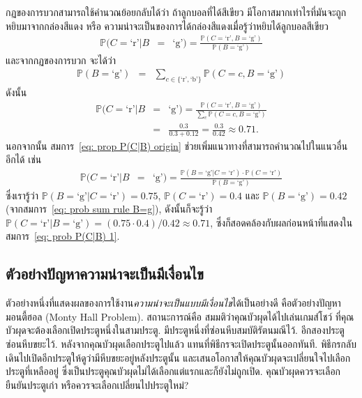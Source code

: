 กฏของการบวกสามารถใช้คำนวณย้อยกลับได้ว่า ถ้าลูกบอลที่ได้สีเขียว มีโอกาสมากเท่าไรที่มันจะถูกหยิบมาจากกล่องสีแดง
หรือ ความน่าจะเป็นของการได้กล่องสีแดงเมื่อรู้ว่าหยิบได้ลูกบอลสีเขียว
\begin{eqnarray}
\mathbb{P}(C = \mbox{`r'}|B &=& \mbox{`g'}) = \frac{\mathbb{P}(C = \mbox{`r'},B = \mbox{`g'})}{\mathbb{P}(B = \mbox{`g'})}
\label{eq: prop P(C|B) origin} 
\end{eqnarray}
และจากกฏของการบวก จะได้ว่า
\begin{eqnarray}
\mathbb{P}(B = \mbox{`g'}) &=&
  \sum_{c \in \{\mbox{`r'}, \mbox{`b'}\} } \mathbb{P}(C=c,B = \mbox{`g'})
\nonumber 
\end{eqnarray}
ดังนั้น
\begin{eqnarray}
\mathbb{P}(C = \mbox{`r'}|B &=& \mbox{`g'}) = \frac{\mathbb{P}(C = \mbox{`r'},B = \mbox{`g'})}{\sum_c \mathbb{P}(C=c,B = \mbox{`g'})}
\label{eq: prob P(C|B) 1} \\
&=& \frac{0.3}{0.3 + 0.12} = \frac{0.3}{0.42} \approx 0.71
\nonumber .
\end{eqnarray}
นอกจากนั้น 
สมการ~\ref{eq: prop P(C|B) origin} ช่วยเพิ่มแนวทางที่สามารถคำนวณไปในแนวอื่นอีกได้ เช่น
\begin{eqnarray}
\mathbb{P}(C = \mbox{`r'}|B &=& \mbox{`g'}) = \frac{\mathbb{P}(B = \mbox{`g'}|C = \mbox{`r'}) \cdot \mathbb{P}(C = \mbox{`r'})}{\mathbb{P}(B = \mbox{`g'})}
\label{eq: prop P(C|B) 2} 
\end{eqnarray}
ซึ่งเรารู้ว่า $\mathbb{P}(B = \mbox{`g'}|C = \mbox{`r'}) = 0.75$, 
$\mathbb{P}(C = \mbox{`r'}) = 0.4$ และ $\mathbb{P}(B = \mbox{`g'}) =0.42$ (จากสมการ~\ref{eq: prob sum rule B=g}), ดังนั้นก็จะรู้ว่า
$\mathbb{P}(C = \mbox{`r'}|B = \mbox{`g'}) = (0.75 \cdot 0.4)/0.42 \approx 0.71$, ซึ่งก็สอดคล้องกับผลก่อนหน้าที่แสดงในสมการ~\ref{eq: prob P(C|B) 1}.

\subsection{ตัวอย่างปัญหาความน่าจะเป็นมีเงื่อนไข}

ตัวอย่างหนึ่งที่แสดงผลของการใช้งาน\textit{ความน่าจะเป็นแบบมีเงื่อนไข}ได้เป็นอย่างดี 
คือตัวอย่างปัญหามอนตี้ฮอล (Monty Hall Problem).
 
สถานะการณ์คือ สมมติว่าคุณบัวผุดได้ไปเล่นเกมส์โชว์ ที่คุณบัวผุดจะต้องเลือกเปิดประตูหนึ่งในสามประตู.
มีประตูหนึ่งที่ซ่อนหีบสมบัติรัตนมณีไว้.
อีกสองประตูซ่อนหีบขยะไว้.
หลังจากคุณบัวผุดเลือกประตูไปแล้ว แทนที่พิธีกรจะเปิดประตูนั้นออกทันที.
พิธีกรกลับเดินไปเปิดอีกประตูให้ดูว่ามีหีบขยะอยู่หลังประตูนั้น 
และเสนอโอกาสให้คุณบัวผุดจะเปลี่ยนใจไปเลือกประตูที่เหลืออยู่ ซึ่งเป็นประตูคุณบัวผุดไม่ได้เลือกแต่แรกและก็ยังไม่ถูกเปิด.
คุณบัวผุดควรจะเลือกยืนยันประตูเก่า หรือควรจะเลือกเปลี่ยนไปประตูใหม่?

